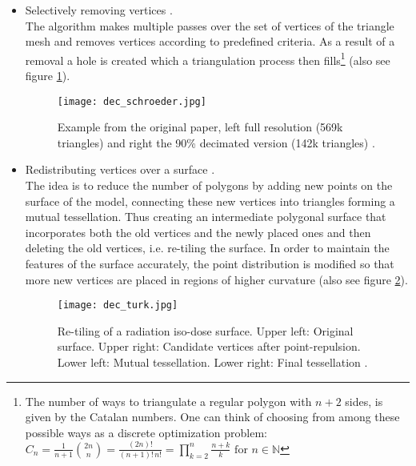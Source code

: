 \begin{itemize}
    \item Selectively removing vertices \citep[cf.][]{Schroeder1992}.\\
The algorithm makes multiple passes over the set of vertices of the triangle mesh and removes vertices according to predefined criteria. As a result of a removal a hole is created which a triangulation process then fills\footnote{ The number of ways to triangulate a regular polygon with $n+2$ sides, is given by the Catalan numbers. One can think of choosing from among these possible ways as a discrete optimization problem:\\
$C_{n} = \frac{1}{n+1}{2n \choose n} = \frac{(2n)!}{(n+1)!\,n!} = \prod \limits_{k=2}^{n}\frac{n+k}{k} \text{ for } n \in \mathbb{N}$} (also see figure \ref{fig:dec_schroeder}).
\begin{figure}[hbt]
\centering
\texttt{[image: dec\_schroeder.jpg]}
\caption{Example from the original paper, left full resolution (569k triangles) and right the 90\% decimated version (142k triangles) \citep[][p.68]{Schroeder1992}.}
\label{fig:dec_schroeder}
\end{figure} 

    \item Redistributing vertices over a surface \citep[cf.][]{Turk1992}.\\
The idea is to reduce the number of polygons by adding new points on the surface of the model, connecting these new vertices into triangles forming a mutual tessellation. Thus creating an intermediate polygonal surface that incorporates both the old vertices and the newly placed ones and then deleting the old vertices, i.e. re-tiling the surface. In order to maintain the features of the surface accurately, the point distribution is modified so that more new vertices are placed in regions of higher curvature (also see figure \ref{fig:dec_turk}).
\begin{figure}[ht]
\centering
\texttt{[image: dec\_turk.jpg]}
\caption{Re-tiling of a radiation iso-dose surface. Upper left: Original surface. Upper right: Candidate vertices after point-repulsion. Lower left: Mutual tessellation. Lower right: Final tessellation \citep[][p.58]{Turk1992}.}
\label{fig:dec_turk}
\end{figure} 


\end{itemize}
